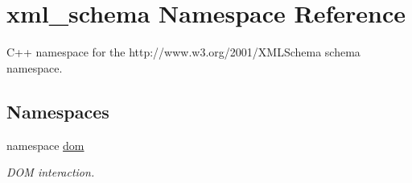 \hypertarget{namespacexml__schema}{\section{xml\-\_\-schema Namespace Reference}
\label{namespacexml__schema}
}


C++ namespace for the http\-://www.w3.\-org/2001/\-X\-M\-L\-Schema schema namespace.  


\subsection*{Namespaces}
\begin{DoxyCompactItemize}
\item 
namespace \hyperlink{namespacexml__schema_1_1dom}{dom}
\begin{DoxyCompactList}\small\item\em D\-O\-M interaction. \end{DoxyCompactList}\end{DoxyCompactItemize}
